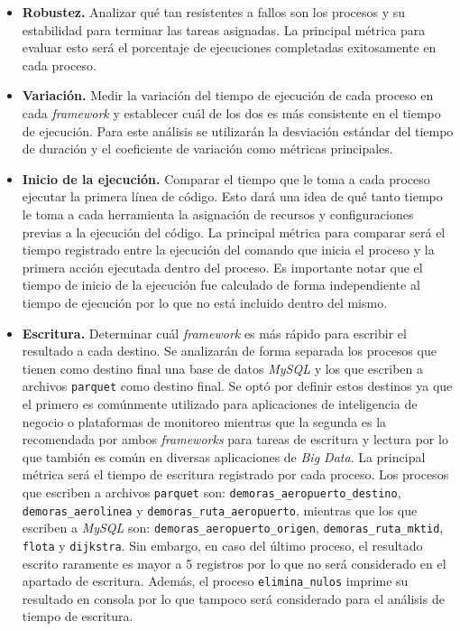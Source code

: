 \begin{itemize}
	
	\item \textbf{Robustez.} Analizar qué tan resistentes a fallos son los procesos y su estabilidad para terminar las tareas asignadas. La principal métrica para evaluar esto será el porcentaje de ejecuciones completadas exitosamente en cada proceso.
	
	\item \textbf{Variación.} Medir la variación del tiempo de ejecución de cada proceso en cada \textit{framework} y establecer cuál de los dos es más consistente en el tiempo de ejecución. Para este análisis se utilizarán la desviación estándar del tiempo de duración y el coeficiente de variación como métricas principales.
	
	\item \textbf{Inicio de la ejecución.} Comparar el tiempo que le toma a cada proceso ejecutar la primera línea de código. Esto dará una idea de qué tanto tiempo le toma a cada herramienta la asignación de recursos y configuraciones previas a la ejecución del código. La principal métrica para comparar será el tiempo registrado entre la ejecución del comando que inicia el proceso y la primera acción ejecutada dentro del proceso. Es importante notar que el tiempo de inicio de la ejecución fue calculado de forma independiente al tiempo de ejecución por lo que no está incluido dentro del mismo.
	
	\item \textbf{Escritura.} Determinar cuál \textit{framework} es más rápido para escribir el resultado a cada destino. Se analizarán de forma separada los procesos que tienen como destino final una base de datos \textit{MySQL} y los que escriben a archivos \texttt{parquet} como destino final. Se optó por definir estos destinos ya que el primero es comúnmente utilizado para aplicaciones de inteligencia de negocio o plataformas de monitoreo mientras que la segunda es la recomendada por ambos \textit{frameworks} para tareas de escritura y lectura por lo que también es común en diversas aplicaciones de \textit{Big Data}. La principal métrica será el tiempo de escritura registrado por cada proceso. Los procesos que escriben a archivos \texttt{parquet} son: \texttt{demoras\_aeropuerto\_destino}, \texttt{demoras\_aerolinea} y \texttt{demoras\_ruta\_aeropuerto}, mientras que los que escriben a \textit{MySQL} son: \texttt{demoras\_aeropuerto\_origen}, \texttt{demoras\_ruta\_mktid}, \texttt{flota} y \texttt{dijkstra}. Sin embargo, en caso del último proceso, el resultado escrito raramente es mayor a 5 registros por lo que no será considerado en el apartado de escritura. Además, el proceso \texttt{elimina\_nulos} imprime su resultado en consola por lo que tampoco será considerado para el análisis de tiempo de escritura.
	

\end{itemize}
